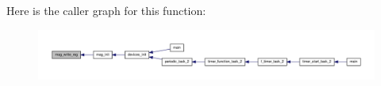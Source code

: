 Here is the caller graph for this function\-:
\nopagebreak
\begin{figure}[H]
\begin{center}
\leavevmode
\includegraphics[width=350pt]{group__imu_gab5d0ae421cd4bb10b1b7a1eda167416b_icgraph}
\end{center}
\end{figure}


